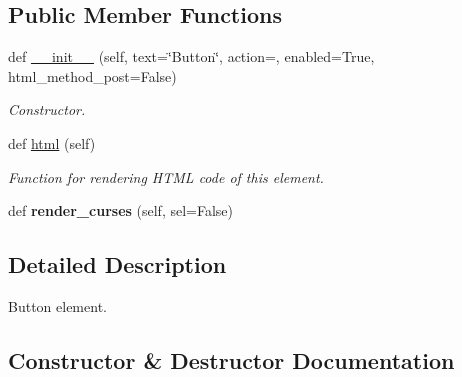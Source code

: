 \subsection*{Public Member Functions}
\begin{DoxyCompactItemize}
\item 
def \hyperlink{classwax_1_1Components_1_1WButton_a83f8a36633e5b1bd2450cac551dffc21}{\+\_\+\+\_\+init\+\_\+\+\_\+} (self, text=\char`\"{}Button\char`\"{}, action=\textquotesingle{}\textquotesingle{}, enabled=True, html\+\_\+method\+\_\+post=False)
\begin{DoxyCompactList}\small\item\em Constructor. \end{DoxyCompactList}\item 
def \hyperlink{classwax_1_1Components_1_1WButton_a267e6a05324a1f27470bf05127c462fe}{html} (self)
\begin{DoxyCompactList}\small\item\em Function for rendering H\+T\+ML code of this element. \end{DoxyCompactList}\item 
def {\bfseries render\+\_\+curses} (self, sel=False)\hypertarget{classwax_1_1Components_1_1WButton_abb75f46a3eb9bbeb2a0aa267e4ce0534}{}\label{classwax_1_1Components_1_1WButton_abb75f46a3eb9bbeb2a0aa267e4ce0534}

\end{DoxyCompactItemize}


\subsection{Detailed Description}
Button element. 

\subsection{Constructor \& Destructor Documentation}
